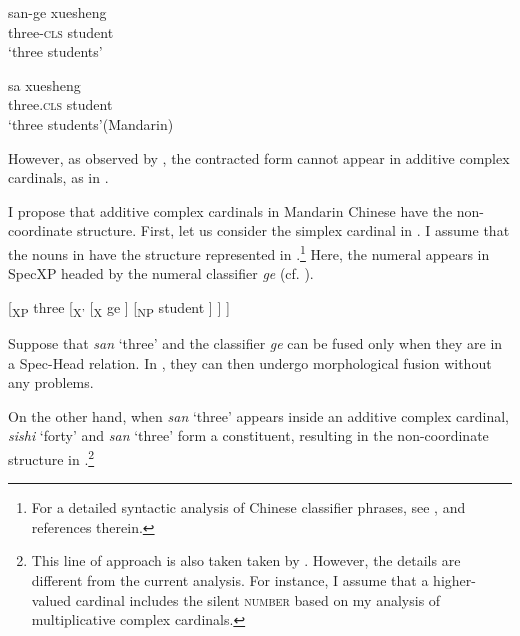 \documentclass[output=paper]{langscibook}
\begin{document}
\ea\label{tat:ex:chi.contraction.simple}
\ea\label{tat:}
\gll san-ge xuesheng\\  
      three-\textsc{cls} student\\ 
\glt `three students'

\ex\label{tat:sa}
\gll sa xuesheng\\  
      three.\textsc{cls} student\\ 
\glt  `three students'\hfill(Mandarin)
\z\z


\noindent However, as observed by \citet{He2015}, the contracted form cannot appear in additive complex cardinals, as in . 


\ea\label{tat:ex:chi.contraction.mul}
\z\z


\noindent I propose that additive complex cardinals in Mandarin Chinese have the non-coordinate structure. First, let us consider the simplex cardinal in . I assume that the nouns in  have the structure represented in .\footnote{For a detailed syntactic analysis of Chinese classifier phrases, see \citet{Zhang2013}, \citet{HuangOchi2014} and references therein.} Here, the numeral  appears in SpecXP headed by the numeral classifier \textit{ge} (cf. ).

\ea\label{tat:ex:chi.contraction.st1}
{[}\textsubscript{XP} three [\textsubscript{X'} [\textsubscript{X} ge ] [\textsubscript{NP} student ] ] ]
\z

\noindent Suppose that \textit{san} `three' and the classifier \textit{ge} can be fused only when they are in a Spec-Head relation. In , they can then undergo morphological fusion without any problems. 

On the other hand, when \textit{san} `three' appears inside an additive complex cardinal, \textit{sishi} `forty' and \textit{san} `three' form a constituent, resulting in the non-coordinate structure in .\footnote{This line of approach is also taken taken by \citet{He2015}. However, the details are different from the current analysis. For instance, I assume that a higher-valued cardinal includes the silent \textsc{number} based on my analysis of multiplicative complex cardinals.}
\end{document}
